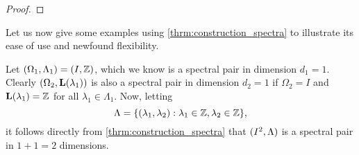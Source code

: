 \documentclass[../thesis.tex]{subfiles}
\begin{document}
\begin{proof}
\end{proof}

Let us now give some examples using \cref{thrm:construction_spectra} to illustrate its ease of use and newfound flexibility. 
\begin{example}\label{exmp:first_construction}
    Let $(\Omega_1,\Lambda_1)=(I, \mathbb{Z})$, which we know is a spectral pair in dimension $d_1=1$. Clearly $(\Omega_2,\mathbf{L}(\lambda_1))$ is also a spectral pair in dimension $d_2=1$ if $\Omega_2=I$ and $\mathbf{L}(\lambda_1) = \mathbb{Z}$ for all $\lambda_1 \in \Lambda_1$. Now, letting 
    \begin{equation}\label{eq:first_construction}
        \Lambda  = \{(\lambda_1,\lambda_2): \lambda_1 \in \mathbb{Z}, \lambda_2 \in \mathbb{Z} \},
    \end{equation}
    it follows directly from \cref{thrm:construction_spectra} that $(I^2, \Lambda)$ is a spectral pair in $1+1=2$ dimensions.
\end{example}
\end{document}
